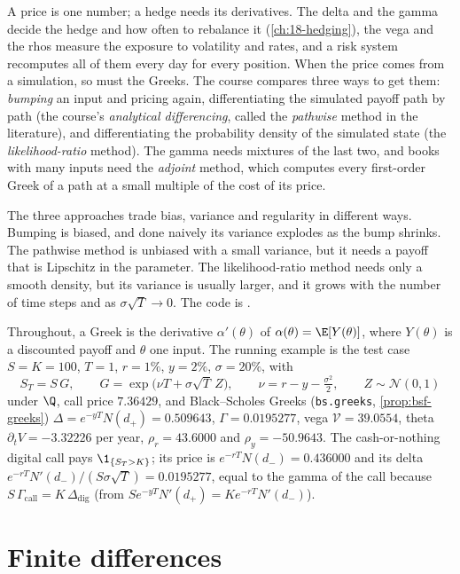 
A price is one number; a hedge needs its derivatives. The delta and the gamma decide the
hedge and how often to rebalance it (\cref{ch:18-hedging}), the vega and the rhos measure
the exposure to volatility and rates, and a risk system recomputes all of them every day
for every position. When the price comes from a simulation, so must the Greeks. The course
compares three ways to get them: \emph{bumping} an input and pricing again, differentiating
the simulated payoff path by path (the course's \emph{analytical differencing}, called the
\emph{pathwise} method in the literature), and differentiating the probability density of
the simulated state (the \emph{likelihood-ratio} method). The gamma needs mixtures of the
last two, and books with many inputs need the \emph{adjoint} method, which computes every
first-order Greek of a path at a small multiple of the cost of its price.

The three approaches trade bias, variance and regularity in different ways. Bumping is
biased, and done naively its variance explodes as the bump shrinks. The pathwise method is
unbiased with a small variance, but it needs a payoff that is Lipschitz in the parameter.
The likelihood-ratio method needs only a smooth density, but its variance is usually larger,
and it grows with the number of time steps and as $\sigma\sqrt T\to0$. The code is
.

Throughout, a Greek is the derivative $\alpha'(\theta)$ of $\alpha(\theta)=\E[Y(\theta)]$,
where $Y(\theta)$ is a discounted payoff and $\theta$ one input. The running example is the
test case $S=K=100$, $T=1$, $r=1\%$, $y=2\%$, $\sigma=20\%$, with
\[
  S_T=S\,G,\qquad G=\exp\big(\nu T+\sigma\sqrt T\,Z\big),\qquad \nu=r-y-\tfrac{\sigma^2}2,\qquad Z\sim\mathcal N(0,1)
\]
under $\Q$, call price $7.36429$, and Black--Scholes Greeks (\texttt{bs.greeks},
\cref{prop:bsf-greeks}) $\Delta=e^{-yT}N(d_+)=0.509643$, $\Gamma=0.0195277$, vega
$\mathcal V=39.0554$, theta $\partial_tV=-3.32226$ per year, $\rho_r=43.6000$ and
$\rho_y=-50.9643$. The cash-or-nothing digital call pays $\1_{\{S_T>K\}}$; its price is
$e^{-rT}N(d_-)=0.436000$ and its delta $e^{-rT}N'(d_-)/(S\sigma\sqrt T)=0.0195277$, equal to
the gamma of the call because $S\,\Gamma_{\mathrm{call}}=K\,\Delta_{\mathrm{dig}}$ (from
$Se^{-yT}N'(d_+)=Ke^{-rT}N'(d_-)$).

\section{Finite differences}\label{sec:gr-fd}

